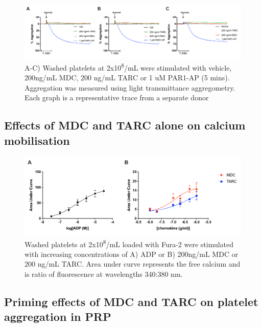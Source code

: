 \documentclass[11pt,twoside]{bristolthesis}
\begin{document}
\begin{figure}
\includegraphics{figure/Chemokines/Layouts/MDC_TARC_alone_wp_aggregation} \caption[The effect of the chemokines MDC and TARC alone on aggregation in washed platelets]{A-C) Washed platelets at 2x10\textsuperscript{8}/mL were stimulated with vehicle, 200ng/mL MDC, 200 ng/mL TARC or 1 uM PAR1-AP (5 mins). Aggregation was measured using light transmittance aggregometry. Each graph is a representative trace from a separate donor}\label{fig:MDC-TARC-wp-alone-aggregation}
\end{figure}
\hypertarget{effects-of-mdc-and-tarc-alone-on-calcium-mobilisation}{%
\subsection{Effects of MDC and TARC alone on calcium mobilisation}\label{effects-of-mdc-and-tarc-alone-on-calcium-mobilisation}}



\begin{figure}
\includegraphics{figure/Chemokines/Layouts/MDC_TARC_calcium_wp} \caption[The effect of ADP and the chemokines MDC and TARC alone on calcium mobilisation in washed platelets.]{Washed platelets at 2x10\textsuperscript{8}/mL loaded with Fura-2 were stimulated with increasing concentrations of A) ADP or B) 200ng/mL MDC or 200 ng/mL TARC. Area under curve represents the free calcium and is ratio of fluorescence at wavelengths 340:380 nm.}\label{fig:MDC-TARC-wp-calcium}
\end{figure}
\hypertarget{priming-effects-of-mdc-and-tarc-on-platelet-aggregation-in-prp}{%
\subsection{Priming effects of MDC and TARC on platelet aggregation in PRP}\label{priming-effects-of-mdc-and-tarc-on-platelet-aggregation-in-prp}}
\end{document}
